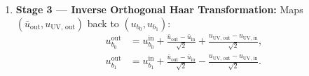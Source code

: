 \documentclass[11pt,a4paper]{article}
\theoremstyle{definition}
\begin{document}
\begin{enumerate}
\begin{equation}
\end{equation}
\item \textbf{Stage 3 --- Inverse Orthogonal Haar Transformation:} Maps $(\bar{u}_{\text{out}}, u_{\text{UV, out}})$ back to $(u_{b_0}, u_{b_1})$:
\begin{equation}
\begin{aligned}
u_{b_0}^{\text{out}} &= u_{b_0}^{\text{in}} + \frac{\bar{u}_{\text{out}} - \bar{u}_{\text{in}}}{\sqrt{2}} + \frac{u_{\text{UV, out}} - u_{\text{UV, in}}}{\sqrt{2}}, \\[4pt]
u_{b_1}^{\text{out}} &= u_{b_1}^{\text{in}} + \frac{\bar{u}_{\text{out}} - \bar{u}_{\text{in}}}{\sqrt{2}} - \frac{u_{\text{UV, out}} - u_{\text{UV, in}}}{\sqrt{2}}.
\end{aligned}
\end{equation}
\end{enumerate}
\end{document}
